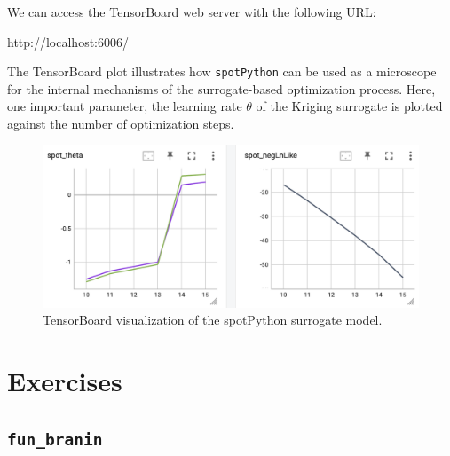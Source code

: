 \documentclass[
  letterpaper,
  DIV=11,
  numbers=noendperiod]{scrreprt}
\newenvironment{Shaded}{\begin{snugshade}}{\end{snugshade}}
\newcommand{\NormalTok}[1]{\textcolor[rgb]{0.00,0.23,0.31}{#1}}
\begin{document}
We can access the TensorBoard web server with the following URL:

\begin{Shaded}
\begin{Highlighting}[]
\NormalTok{http://localhost:6006/}
\end{Highlighting}
\end{Shaded}

The TensorBoard plot illustrates how \texttt{spotPython} can be used as
a microscope for the internal mechanisms of the surrogate-based
optimization process. Here, one important parameter, the learning rate
\(\theta\) of the Kriging surrogate is plotted against the number of
optimization steps.

\begin{figure}

{\centering \includegraphics[width=1\textwidth,height=\textheight]{figures_static/03_tensorboard_03.png}

}

\caption{TensorBoard visualization of the spotPython surrogate model.}

\end{figure}

\hypertarget{exercises-3}{%
\section{Exercises}\label{exercises-3}}

\hypertarget{fun_branin}{%
\subsection{\texorpdfstring{\texttt{fun\_branin}}{fun\_branin}}\label{fun_branin}}
\end{document}
